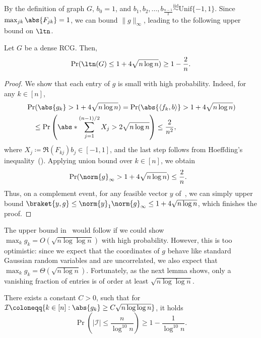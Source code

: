 By the definition of graph \(G\), \(b_0 = 1\), and \(b_1, b_2, \ldots, b_{\frac{n - 1}{2}} \overset{\mathrm{iid}}{\sim} \mathrm{Unif}\{-1, 1\}\).
Since \(\max_{jk} \abs{F_{jk}} = 1\), we can bound \(\|g\|_{\infty}\), leading to the following upper bound on \(\ltn\).
\begin{lemma}
\label{lem:nlogn_ub}
Let \(G\) be a dense RCG. Then,
\begin{equation}
\Pr(\ltn(G) \leq 1 + 4\sqrt{n \log n}) \geq 1 - \frac{2}{n}.
\end{equation}
\end{lemma}
\begin{proof}
We show that each entry of \(g\) is small with high probability. Indeed, for any \(k \in [n]\),
\begin{equation}
\begin{aligned}
&\Pr(\abs{g_k} > 1 + 4 \sqrt{n \log n}) = \Pr(\abs{\langle f_k, b \rangle} > 1 + 4 \sqrt{n \log n}) \\
&\quad \leq \Pr\left(\abs*{\sum_{j = 1}^{(n - 1) / 2}X_j} > 2 \sqrt{n \log n}\right) \leq \frac{2}{n^2},
\end{aligned}
\end{equation}
where \(X_j \coloneqq \Re(F_{kj})b_j \in [-1, 1]\), and the last step follows from Hoeffding's inequality~().
Applying union bound over \(k \in [n]\), we obtain
\begin{equation}
\label{eq:linf_norm}
\begin{aligned}
    &\Pr(\norm{g}_{\infty} > 1 + 4 \sqrt{n \log n}) \leq \frac{2}{n}.
\end{aligned}
\end{equation}
Thus, on a complement event, for any feasible vector \(y\) of~, we can simply upper bound \(\braket{y, g} \leq \norm{y}_{1} \norm{g}_{\infty} \leq 1 + 4\sqrt{n \log n}\), which finishes the proof.
\end{proof}

The upper bound in~ would follow if we could show \(\max_k g_k = O(\sqrt{n \log \log n})\) with high probability.
However, this is too optimistic: since we expect that the coordinates of \(g\) behave like standard Gaussian random variables and are uncorrelated, 
we also expect that \(\max_k g_k = \Theta(\sqrt{n \log n})\). 
Fortunately, as the next lemma shows, only a vanishing fraction of entries is of order at least \(\sqrt{n \log \log n}\).
\begin{lemma}
\label{lem:few_large}
There exists a constant \(C > 0\), such that for \(\mathcal{I} \coloneqq \{k \in [n]: \abs{g_k} \geq C \sqrt{n\log \log n}\}\), it holds
    \begin{equation}
        \Pr\left(\lvert \mathcal{I} \rvert \leq \frac{n}{\log^{10} n}\right) \geq 1 - \frac{1}{\log^{10} n}.
    \end{equation}
\end{lemma}

